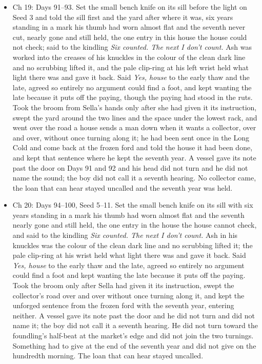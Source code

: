 \documentclass{design/chronicle}
\begin{document}
{\begin{itemize}[leftmargin=1.4em,itemsep=1pt,topsep=3pt,parsep=0pt]
\item Ch 19: Days 91–93. Set the small bench knife on its sill before the light on Seed 3 and told the sill first and the yard after where it was, six years standing in a mark his thumb had worn almost flat and the seventh never cut, nearly gone and still held, the one entry in this house the house could not check; said to the kindling \emph{Six counted. The next I don’t count.} Ash was worked into the creases of his knuckles in the colour of the clean dark line and no scrubbing lifted it, and the pale clip-ring at his left wrist held what light there was and gave it back. Said \emph{Yes, house} to the early thaw and the late, agreed so entirely no argument could find a foot, and kept wanting the late because it puts off the paying, though the paying had stood in the ruts. Took the broom from Sella’s hands only after she had given it its instruction, swept the yard around the two lines and the space under the lowest rack, and went over the road a house sends a man down when it wants a collector, over and over, without once turning along it; he had been sent once in the Long Cold and come back at the frozen ford and told the house it had been done, and kept that sentence where he kept the seventh year. A vessel gave its note past the door on Days 91 and 92 and his head did not turn and he did not name the sound; the boy did not call it a seventh hearing. No collector came, the loan that can hear stayed uncalled and the seventh year was held.

\end{itemize}

\begin{itemize}[leftmargin=1.4em,itemsep=1pt,topsep=3pt,parsep=0pt]

\item Ch 20: Days 94–100, Seed 5–11. Set the small bench knife on its sill with six years standing in a mark his thumb had worn almost flat and the seventh nearly gone and still held, the one entry in the house the house cannot check, and said to the kindling \emph{Six counted. The next I don’t count.} Ash in his knuckles was the colour of the clean dark line and no scrubbing lifted it; the pale clip-ring at his wrist held what light there was and gave it back. Said \emph{Yes, house} to the early thaw and the late, agreed so entirely no argument could find a foot and kept wanting the late because it puts off the paying. Took the broom only after Sella had given it its instruction, swept the collector’s road over and over without once turning along it, and kept the unforged sentence from the frozen ford with the seventh year, entering neither. A vessel gave its note past the door and he did not turn and did not name it; the boy did not call it a seventh hearing. He did not turn toward the foundling’s half-beat at the market’s edge and did not join the two turnings. Something had to give at the end of the seventh year and did not give on the hundredth morning. The loan that can hear stayed uncalled.


\end{itemize}}
\end{document}
